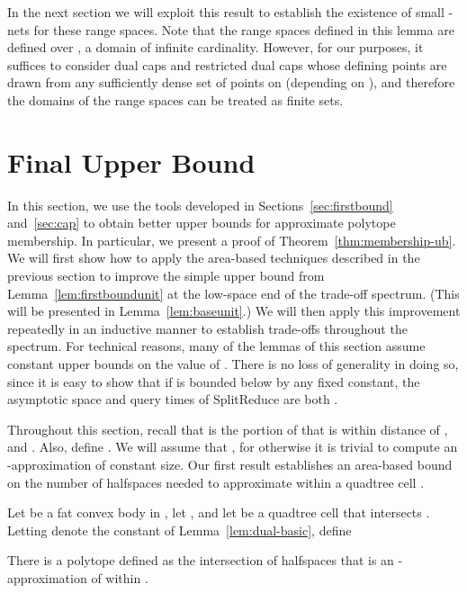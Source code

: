 \documentclass[11pt]{article}   \usepackage[letterpaper,hmargin=2.1cm,vmargin=3cm]{geometry}
\newcommand{\alg}{\textrm{SplitReduce}}
\begin{document}
In the next section we will exploit this result to establish the existence of small -nets for these range spaces. Note that the range spaces defined in this lemma are defined over , a domain of infinite cardinality. However, for our purposes, it suffices to consider dual caps and restricted dual caps whose defining points are drawn from any sufficiently dense set of points on  (depending on ), and therefore the domains of the range spaces can be treated as finite sets.

\section{Final Upper Bound} \label{sec:membership}


In this section, we use the tools developed in Sections~\ref{sec:firstbound} and~\ref{sec:cap} to obtain better upper bounds for approximate polytope membership. In particular, we present a proof of Theorem~\ref{thm:membership-ub}. We will first show how to apply the area-based techniques described in the previous section to improve the simple upper bound from Lemma~\ref{lem:firstboundunit} at the low-space end of the trade-off spectrum. (This will be presented in Lemma~\ref{lem:baseunit}.) We will then apply this improvement repeatedly in an inductive manner to establish trade-offs throughout the spectrum. For technical reasons, many of the lemmas of this section assume constant upper bounds on the value of . There is no loss of generality in doing so, since it is easy to show that if  is bounded below by any fixed constant, the asymptotic space and query times of {\alg} are both .

Throughout this section, recall that  is the portion of  that is within distance  of , and . Also, define . We will assume that , for otherwise it is trivial to compute an -approximation of constant size. Our first result establishes an area-based bound on the number of halfspaces needed to approximate  within a quadtree cell .

\begin{lemma} \label{lem:Guilherme}
Let  be a fat convex body in , let , and let  be a quadtree cell that intersects . Letting  denote the constant of Lemma~\ref{lem:dual-basic}, define

There is a polytope  defined as the intersection of  halfspaces that is an -approximation of  within .
\end{lemma}
\end{document}

